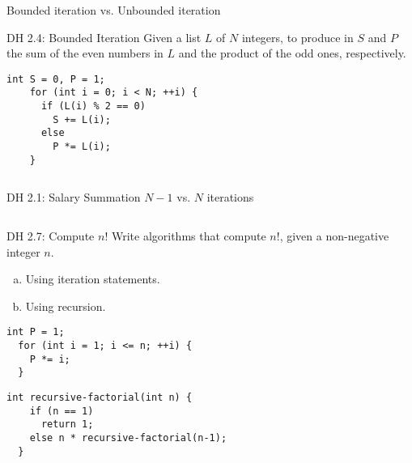 \begin{frame}{}
  Bounded iteration vs. Unbounded iteration
\end{frame}

\begin{frame}[fragile]{}
  \begin{exampleblock}{DH 2.4: Bounded Iteration}
    Given a list $L$ of $N$ integers,
    to produce in $S$ and $P$ the sum of the even numbers in $L$ and the product of the odd ones, respectively.
  \end{exampleblock}

  \pause
  \begin{lstlisting}[style = Cstyle]
    int S = 0, P = 1;
    for (int i = 0; i < N; ++i) {
      if (L(i) % 2 == 0)
        S += L(i);
      else
        P *= L(i);
    }
  \end{lstlisting}

  \begin{columns}
    \pause
      \begin{exampleblock}{DH 2.1: Salary Summation}
	$N-1$ vs. $N$ iterations
      \end{exampleblock}
    \pause
  \end{columns}
\end{frame}

\begin{frame}[fragile]{}
  \begin{exampleblock}{DH 2.7: Compute $n!$}
    Write algorithms that compute $n!$, given a non-negative integer $n$.
    \begin{enumerate}[(a)]
      \item Using iteration statements.
      \item Using recursion.
    \end{enumerate}
  \end{exampleblock}

  \pause
  \begin{lstlisting}[style = Cstyle]
  int P = 1;
  for (int i = 1; i <= n; ++i) {
    P *= i;
  }
  \end{lstlisting}

  \pause
  \begin{lstlisting}[style = Cstyle]
  int recursive-factorial(int n) {
    if (n == 1)
      return 1;
    else n * recursive-factorial(n-1);
  }
  \end{lstlisting}
\end{frame}
